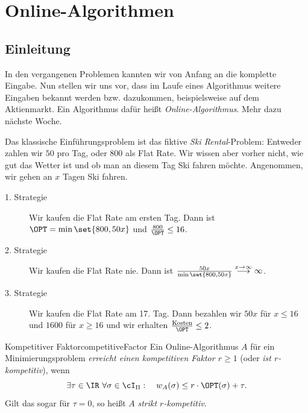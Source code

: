 \documentclass[language=ngerman,algolist]{TemplateLecture}
\begin{document}
\part{Online-Algorithmen}
\setcounter{chapter}{10}
\chapter{Einleitung}

In den vergangenen Problemen kannten wir von Anfang an die komplette Eingabe. Nun stellen wir uns vor, dass im Laufe eines Algorithmus weitere Eingaben bekannt werden bzw. dazukommen, beispielsweise auf dem Aktienmarkt. Ein Algorithmus dafür heißt \emph{Online-Algorithmus}. Mehr dazu nächste Woche.


Das klassische Einführungsproblem ist das fiktive \emph{Ski Rental}-Problem: Entweder zahlen wir $50$ pro Tag, oder $800$ als Flat Rate. Wir wissen aber vorher nicht, wie gut das Wetter ist und ob man an diesem Tag Ski fahren möchte. Angenommen, wir gehen an $x$ Tagen Ski fahren.

\begin{description}
    \item[1. Strategie] Wir kaufen die Flat Rate am ersten Tag. Dann ist $\OPT = \min\set{800, 50x}$ und $\frac{800}{\OPT} \leq 16$.
    \item[2. Strategie] Wir kaufen die Flat Rate nie. Dann ist $\frac{50 x}{\min\set{800, 50x}} \overset{x \to \infty}{\longrightarrow} \infty$.
    \item[3. Strategie] Wir kaufen die Flat Rate am 17. Tag. Dann bezahlen wir $50x$ für $x \leq 16$ und $1600$ für $x \geq 16$ und wir erhalten $\frac{\text{Kosten}}{\OPT} \leq 2$.
\end{description}

\begin{defi}{Kompetitiver Faktor}{competitiveFactor}
    Ein Online-Algorithmus $A$ für ein Minimierungsproblem \emph{erreicht einen kompetitiven Faktor $r \geq 1$} (oder \emph{ist $r$-kompetitiv}), wenn
    \begin{equation*}
        \exists \tau \in \IR ~ \forall \sigma \in \cI_\Pi: \quad w_A(\sigma) \leq r \cdot \OPT(\sigma) + \tau.
    \end{equation*}
    Gilt das sogar für $\tau = 0$, so heißt $A$ \emph{strikt $r$-kompetitiv}.
\end{defi}
\end{document}
